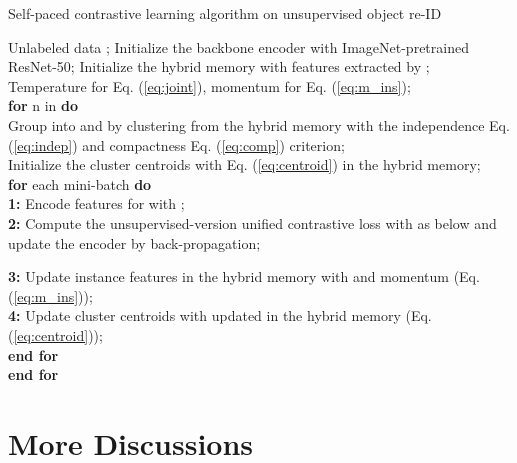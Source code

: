 \documentclass{article}
\begin{document}
\begin{algorithm}[H]
\scriptsize
\caption{\small Self-paced contrastive learning algorithm on unsupervised object re-ID} 
\label{alg_un}
\begin{algorithmic}
\REQUIRE Unlabeled data ;
\REQUIRE Initialize the backbone encoder  with ImageNet-pretrained ResNet-50;
\REQUIRE Initialize the hybrid memory with features extracted by ;
\REQUIRE  Temperature  for Eq. (\ref{eq:joint}), momentum  for Eq. (\ref{eq:m_ins}); \\
\textbf{for} n in  \textbf{do}\\
\quad Group  into  and  by clustering  from the hybrid memory with the independence Eq. (\ref{eq:indep}) and compactness Eq. (\ref{eq:comp}) criterion; \\
\quad Initialize the cluster centroids  with Eq. (\ref{eq:centroid}) in the hybrid memory; \\
\quad \textbf{for} each mini-batch  \textbf{do}\\
\quad \quad \textbf{1:} Encode features  for  with ; \\
\quad \quad \textbf{2:} Compute the unsupervised-version unified contrastive loss with  as below and update the encoder  by back-propagation; \\
\vspace{-10pt}


\vspace{-5pt}
\quad \quad \textbf{3:} Update instance features  in the hybrid memory with  and momentum  (Eq. (\ref{eq:m_ins})); \\
\quad \quad \textbf{4:} Update cluster centroids  with updated  in the hybrid memory (Eq. (\ref{eq:centroid})); \\
\quad \textbf{end for}\\
\textbf{end for}
\end{algorithmic}
\end{algorithm}

\section{More Discussions}
\label{sec:app_discuss}
\end{document}
